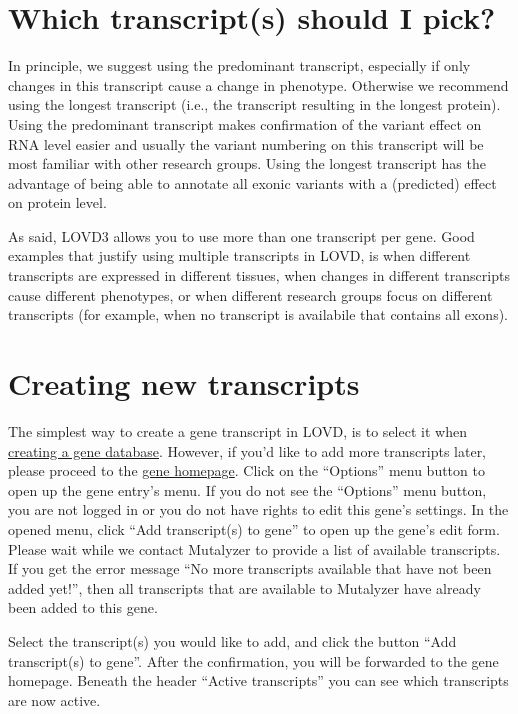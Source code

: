 \documentclass[a4paper,oneside,openany,12pt]{memoir}
\renewenvironment{leftbar}[1][\hsize]
{%
    \def\FrameCommand
    {%
        {\color{LOVDdark}\vrule width 3pt \hspace{5pt}}%
        \colorbox{LOVDlight}%
    }%
    \MakeFramed{\hsize#1\advance\hsize-\width\FrameRestore}%
}
{\endMakeFramed}
\begin{document}
\section{Which transcript(s) should I pick?}
In principle, we suggest using the predominant transcript, especially if only changes in this transcript cause a change in phenotype.
Otherwise we recommend using the longest transcript (i.e., the transcript resulting in the longest protein).
Using the predominant transcript makes confirmation of the variant effect on RNA level easier and
 usually the variant numbering on this transcript will be most familiar with other research groups.
Using the longest transcript has the advantage of being able to annotate all exonic variants with a (predicted) effect on protein level.
\\
\par
As said, LOVD3 allows you to use more than one transcript per gene.
Good examples that justify using multiple transcripts in LOVD, is when different transcripts are expressed in different tissues,
 when changes in different transcripts cause different phenotypes, or when different research groups focus on different transcripts
 (for example, when no transcript is availabile that contains all exons).





\section{Creating new transcripts}
The simplest way to create a gene transcript in LOVD, is to select it when \hyperlink{s_gene_create}{creating a gene database}.
However, if you'd like to add more transcripts later, please proceed to the \hyperlink{s_gene_homepage}{gene homepage}.
Click on the ``Options'' menu button to open up the gene entry's menu.
If you do not see the ``Options'' menu button, you are not logged in or you do not have rights to edit this gene's settings.
In the opened menu, click ``Add transcript(s) to gene'' to open up the gene's edit form.
Please wait while we contact Mutalyzer to provide a list of available transcripts.
If you get the error message ``No more transcripts available that have not been added yet!'',
 then all transcripts that are available to Mutalyzer have already been added to this gene.
\par
Select the transcript(s) you would like to add, and click the button ``Add transcript(s) to gene''.
After the confirmation, you will be forwarded to the gene homepage.
Beneath the header ``Active transcripts'' you can see which transcripts are now active.
\end{document}
